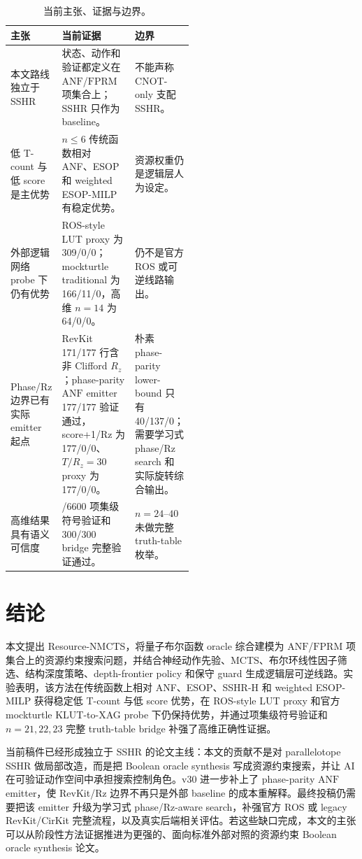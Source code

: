 \documentclass[UTF8,fontset=macnew,11pt]{ctexart}
\newcommand{\method}{Resource-NMCTS}
\newcommand{\anf}{\ensuremath{\mathrm{ANF}}}
\newcommand{\fprm}{\ensuremath{\mathrm{FPRM}}}
\newcommand{\mcts}{\ensuremath{\mathrm{MCTS}}}
\newcommand{\rz}{\ensuremath{R_z}}
\newcommand{\ttable}{truth-table}
\begin{document}
\begin{table}[H]
\centering
\small
\caption{当前主张、证据与边界。}
\label{tab:evidence-map}
\begin{tabularx}{\linewidth}{>{\raggedright\arraybackslash}p{0.27\linewidth}>{\raggedright\arraybackslash}X>{\raggedright\arraybackslash}p{0.25\linewidth}}
\toprule
主张 & 当前证据 & 边界 \\
\midrule
本文路线独立于 SSHR & 状态、动作和验证都定义在 \anf{}/\fprm{} 项集合上；SSHR 只作为 baseline。 & 不能声称 CNOT-only 支配 SSHR。 \\
低 T-count 与低 score 是主优势 & $n\leq6$ 传统函数相对 ANF、ESOP 和 weighted ESOP-MILP 有稳定优势。 & 资源权重仍是逻辑层人为设定。 \\
外部逻辑网络 probe 下仍有优势 & ROS-style LUT proxy 为 309/0/0；mockturtle traditional 为 166/11/0，高维 $n=14$ 为 64/0/0。 & 仍不是官方 ROS 或可逆线路输出。 \\
Phase/Rz 边界已有实际 emitter 起点 & RevKit 171/177 行含非 Clifford \rz{}；phase-parity \anf{} emitter 177/177 验证通过，score+1/Rz 为 177/0/0、$T/R_z=30$ proxy 为 177/0/0。 & 朴素 phase-parity lower-bound 只有 40/137/0；需要学习式 phase/Rz search 和实际旋转综合输出。 \\
高维结果具有语义可信度 & 6600/6600 项集级符号验证和 300/300 bridge 完整验证通过。 & $n=24$--$40$ 未做完整 \ttable{} 枚举。 \\
\bottomrule
\end{tabularx}
\end{table}

\section{结论}

本文提出 \method{}，将量子布尔函数 oracle 综合建模为 \anf{}/\fprm{} 项集合上的资源约束搜索问题，并结合神经动作先验、\mcts{}、布尔环线性因子筛选、结构深度策略、depth-frontier policy 和保守 guard 生成逻辑层可逆线路。实验表明，该方法在传统函数上相对 ANF、ESOP、SSHR-H 和 weighted ESOP-MILP 获得稳定低 T-count 与低 score 优势，在 ROS-style LUT proxy 和官方 mockturtle KLUT-to-XAG probe 下仍保持优势，并通过项集级符号验证和 $n=21,22,23$ 完整 truth-table bridge 补强了高维正确性证据。

当前稿件已经形成独立于 SSHR 的论文主线：本文的贡献不是对 parallelotope SSHR 做局部改造，而是把 Boolean oracle synthesis 写成资源约束搜索，并让 AI 在可验证动作空间中承担搜索控制角色。v30 进一步补上了 phase-parity \anf{} emitter，使 RevKit/Rz 边界不再只是外部 baseline 的成本重解释。最终投稿仍需要把该 emitter 升级为学习式 phase/Rz-aware search，补强官方 ROS 或 legacy RevKit/CirKit 完整流程，以及真实后端相关评估。若这些缺口完成，本文的主张可以从阶段性方法证据推进为更强的、面向标准外部对照的资源约束 Boolean oracle synthesis 论文。
\end{document}
